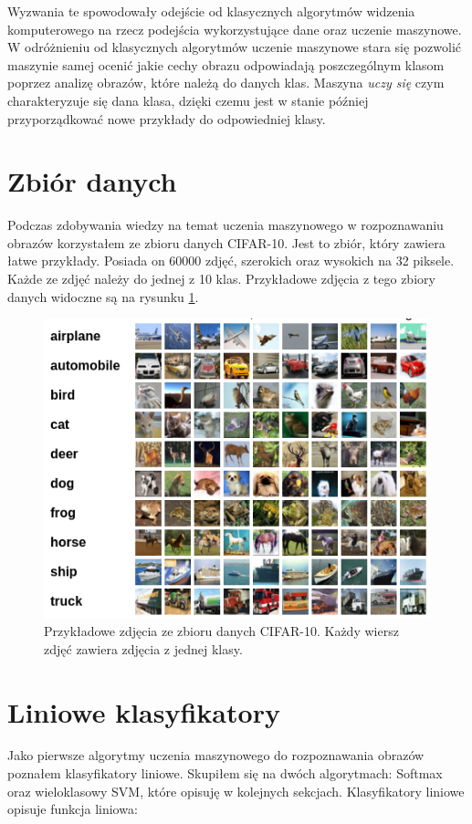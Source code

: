 \documentclass[a4paper,11pt, notitlepage, twosides, openany ]{report}
\begin{document}
	Wyzwania te spowodowały odejście od klasycznych algorytmów widzenia komputerowego na rzecz podejścia wykorzystujące dane oraz uczenie maszynowe. W odróżnieniu od klasycznych algorytmów uczenie maszynowe stara się pozwolić maszynie samej ocenić jakie cechy obrazu odpowiadają poszczególnym klasom poprzez analizę obrazów, które należą do danych klas. Maszyna \textit{uczy się} czym charakteryzuje się dana klasa, dzięki czemu jest w stanie później przyporządkować nowe przykłady do odpowiedniej klasy.

	\section{Zbiór danych}
	Podczas zdobywania wiedzy na temat uczenia maszynowego w rozpoznawaniu obrazów korzystałem ze zbioru danych CIFAR-10\cite{cifar}. Jest to zbiór, który zawiera łatwe przykłady. Posiada on 60000 zdjęć, szerokich oraz wysokich na 32 piksele. Każde ze zdjęć należy do jednej z 10 klas. Przykładowe zdjęcia z tego zbiory danych widoczne są na rysunku \ref{cifar-example}.

	\begin{figure}[h]
		\centering
		\includegraphics[width=0.7 \textwidth]{cifar-10.png}
		\caption{Przykładowe zdjęcia ze zbioru danych CIFAR-10. Każdy wiersz zdjęć zawiera zdjęcia z jednej klasy.}
		\label{cifar-example}
	\end{figure}

	\section{Liniowe klasyfikatory}
	\label{klas-lin}
	Jako pierwsze algorytmy uczenia maszynowego do rozpoznawania obrazów poznałem klasyfikatory liniowe. Skupiłem się na dwóch algorytmach: Softmax oraz wieloklasowy SVM, które opisuję w kolejnych sekcjach. Klasyfikatory liniowe opisuje funkcja liniowa:
\end{document}
